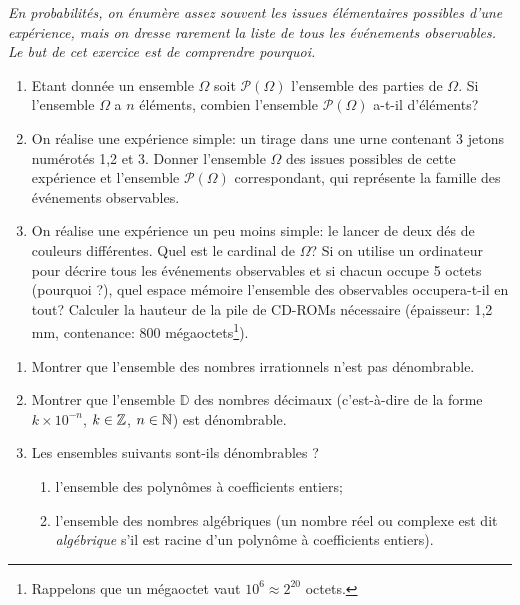 \documentclass[a4paper,12pt,reqno]{amsart}
\begin{document}
\begin{exo} %

  \emph{En probabilités, on énumère assez souvent les issues élémentaires possibles d'une expérience, mais on dresse rarement la liste de tous les événements observables. Le but de cet exercice est de comprendre pourquoi.}

  \begin{enumerate}

    \item Etant donnée un ensemble $\Omega$ soit $\mathcal{P}(\Omega)$ l'ensemble des parties de $\Omega$. Si l'ensemble $\Omega$ a $n$ éléments, combien l'ensemble $\mathcal{P}(\Omega)$ a-t-il d'éléments?

    \item On réalise une expérience simple: un tirage dans une urne contenant 3 jetons numérotés 1,2 et 3.  Donner l'ensemble $\Omega$ des issues possibles de cette expérience et l'ensemble $\mathcal{P}(\Omega)$ correspondant, qui représente la famille des événements observables.

    \item On réalise une expérience un peu moins simple: le lancer de deux dés de couleurs différentes.  Quel est le cardinal de $\Omega$?  Si on utilise un ordinateur pour décrire tous les événements observables et si chacun occupe 5 octets (pourquoi ?), quel espace mémoire l'ensemble des observables occupera-t-il en tout?  Calculer la hauteur de la pile de CD-ROMs nécessaire (épaisseur: 1,2\,mm, contenance: 800 mégaoctets\footnote{Rappelons que un mégaoctet vaut $10^{6} \approx 2^{20}$ octets.}).
  \end{enumerate}
\end{exo}

\begin{exo} %

\begin{enumerate}
  \item Montrer que l'ensemble des nombres irrationnels  n'est pas dénombrable.
  \item Montrer que l'ensemble $\mathbb{D}$ des nombres décimaux (c'est-à-dire de la forme $k\times 10^{-n} $, $k\in\mathbb{Z}$, $n\in\mathbb{N}$) est dénombrable.

  \item Les ensembles suivants sont-ils dénombrables ?
  \begin{enumerate}
    \item l'ensemble des polynômes à coefficients entiers;
    \item l'ensemble des nombres algébriques (un nombre réel ou complexe est dit \emph{algébrique} s'il est racine d'un polynôme à coefficients entiers).
  \end{enumerate}
\end{enumerate}

\end{exo}
\end{document}
